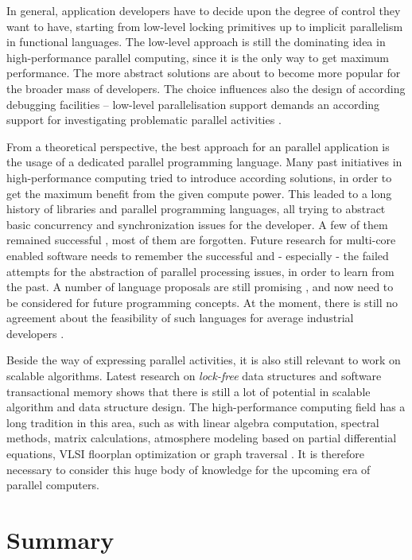 \documentclass[a4paper]{article}
\begin{document}
In general, application developers have to decide upon the degree of control they want to have, starting from low-level locking primitives up to implicit parallelism in functional languages. The low-level approach is still the dominating idea in high-performance parallel computing, since it is the only way to get maximum performance. The more abstract solutions are about to become more popular for the broader mass of developers. The choice influences also the design of according debugging facilities -- low-level parallelisation support demands an according support for investigating problematic parallel activities \cite{choi98deterministic}.

From a theoretical perspective, the best approach for an parallel application is the usage of a dedicated parallel programming language. Many past initiatives in high-performance computing tried to introduce according solutions, in order to get the maximum benefit from the given compute power. This leaded to a long history of libraries and parallel programming languages, all trying to abstract basic concurrency and synchronization issues for the developer. A few of them remained successful \cite{hpf, mpi2,jones:88}, most of them are forgotten. Future research for multi-core enabled software needs to remember the successful and - especially - the failed attempts for the abstraction of parallel processing issues, in order to learn from the past. A number of language proposals are still promising \cite{erlang,esterel}, and now need to be considered for future programming concepts. At the moment, there is still no agreement about the feasibility of such languages for average industrial developers \cite{sutter:concurrency-revolution:acmqueue:2005}.

Beside the way of expressing parallel activities, it is also still relevant to work on scalable algorithms. Latest research on \emph{lock-free} data structures \cite{lockfree} and software transactional memory \cite{larus:tmbook:mcp:2006} shows that there is still a lot of potential in scalable algorithm and data structure design. The high-performance computing field has a long tradition in this area, such as with linear algebra computation, spectral methods, matrix calculations, atmosphere modeling based on partial differential equations, VLSI floorplan optimization or graph traversal \cite{fosterparprog}. It is therefore necessary to consider this huge body of knowledge for the upcoming era of parallel computers. 

\section{Summary}
\end{document}
